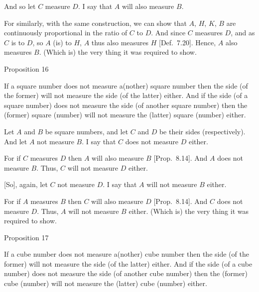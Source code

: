 And so let $C$ measure $D$. I say that $A$ will also measure $B$.

For similarly, with the same construction, we can show that $A$, $H$, $K$, $B$ are continuously proportional in the ratio of $C$ to $D$. And since
$C$ measures $D$, and as $C$ is to $D$, so $A$ (is) to $H$, $A$ thus
also measures $H$ [Def.~7.20]. Hence, $A$ also measures $B$. (Which is) the
very thing it was required to show.


\begin{center}
{\large Proposition 16}
\end{center}

If a square number does not measure a(nother)
square number then  the side (of the former) will not  measure the
side (of the latter) either. And if the side (of a square number) does not measure the
side (of another square number) then the (former)
square (number) will not measure the (latter) square (number) either.

\epsfysize=0.5in
\centerline{}

Let $A$ and $B$ be square numbers, and let $C$ and $D$ be their
sides (respectively). And let $A$ not measure $B$. I say that  $C$ does not measure $D$ either.

For if $C$ measures $D$ then $A$ will also measure $B$
[Prop.~8.14]. And $A$ does not measure $B$. Thus,
$C$ will not measure $D$ either.

\mbox{[}So], again,  let $C$ not measure $D$. I say that $A$ will not measure $B$
either.

For if $A$ measures $B$ then $C$ will also measure $D$ [Prop.~8.14]. And $C$ does not measure $D$.
Thus, $A$ will not measure $B$ either. (Which is) the very thing it was required to show.


\begin{center}
{\large Proposition 17}
\end{center}

If a cube number does not measure a(nother)
cube number then  the side (of the former) will not  measure the
side (of the latter) either. And if the side (of a cube number) does not measure the
side (of another cube number) then the (former)
cube (number) will not measure the (latter) cube (number) either.

\epsfysize=0.5in
\centerline{}

